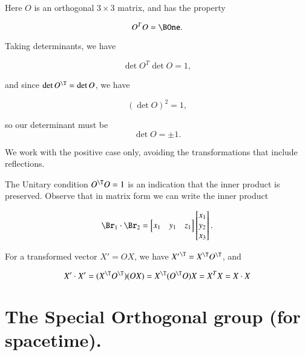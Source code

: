 Here $O$ is an orthogonal $3 \times 3$ matrix, and has the property

\begin{equation}\label{eqn:relativisticElectrodynamicsL6:11}
O^T O = \BOne.
\end{equation}

Taking determinants, we have

\begin{equation}\label{eqn:relativisticElectrodynamicsL6:12}
\det{ O^T } \det{ O} = 1,
\end{equation}

and since $\det{O^\T} = \det{ O }$, we have

\begin{equation}\label{eqn:relativisticElectrodynamicsL6:13}
(\det{O})^2 = 1,
\end{equation}

so our determinant must be 
\begin{equation}\label{eqn:relativisticElectrodynamicsL6:14}
\det O = \pm 1.
\end{equation}

We work with the positive case only, avoiding the transformations that include reflections.

The Unitary condition $O^\T O = 1$ is an indication that the inner product is preserved.  Observe that in matrix form we can write the inner product

\begin{equation}\label{eqn:relativisticElectrodynamicsL6:15}
\Br_1 \cdot \Br_2 = 
\begin{bmatrix}
x_1 & y_1 & z_1
\end{bmatrix}
\begin{bmatrix}
x_1 \\
y_2 \\
x_3 \\
\end{bmatrix}.
\end{equation}

For a transformed vector $X' = O X$, we have ${X'}^\T = X^\T O^\T$, and

\begin{equation}\label{eqn:relativisticElectrodynamicsL6:16}
X' \cdot X' = (X^\T O^\T) (O X) = X^\T (O^\T O) X = X^T X = X \cdot X
\end{equation}

\section{The Special Orthogonal group (for spacetime).}

